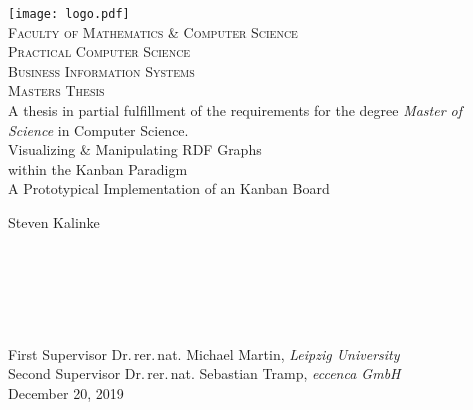 \begin{titlepage}	%
	\begin{center}
		\libertineOsF{}
		\texttt{[image: logo.pdf]}\\[0.75cm]
		\normalsize{\textsc{Faculty of Mathematics \& Computer Science\\Practical Computer Science\\Business Information Systems}}\\[5mm]
		\Large{\textsc{Master\raisebox{-0.5mm}{’}s Thesis}}\\[2mm]
		\small{A thesis in partial fulfillment of the requirements for the degree \textit{Master of Science} in Computer Science.}\\[18mm]
		{\huge Visualizing \& Manipulating RDF Graphs\\[4mm]
		within the Kanban Paradigm}\\[3.5mm]
		\large{A Prototypical Implementation of an  Kanban Board}\\[1.75cm]
		
	\vspace*{\fill} 
	\vspace*{\fill} 
		\begin{flushleft}
			{\large Steven Kalinke}\\[0.1cm]
			\begin{normalsize}
				\\
				\\
				\\[0.3cm]
				\libertineLF{}
				\\
				\\[1.5cm]
				First Supervisor   \tabto*{35mm} Dr.\,rer.\,nat. Michael Martin, \textit{Leipzig University}\\
				Second Supervisor    \tabto*{35mm} Dr.\,rer.\,nat. Sebastian Tramp, \textit{eccenca GmbH}\\[5mm]
				\libertineOsF{}
				December 20, 2019
			\end{normalsize}
		\end{flushleft}
	\end{center}
\end{titlepage}
